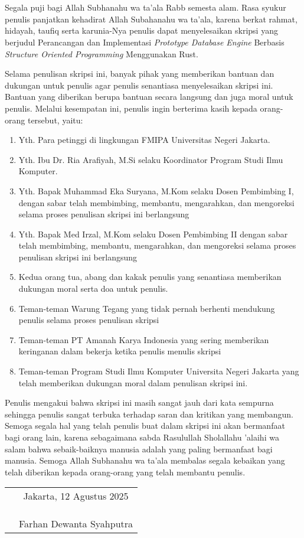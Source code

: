 \chapter*{}
\onehalfspacing{}
Segala puji bagi Allah Subhanahu wa ta'ala Rabb semesta alam. Rasa syukur penulis 
panjatkan kehadirat Allah Subahanahu wa ta'ala, karena berkat rahmat, hidayah, 
taufiq serta karunia-Nya penulis dapat menyelesaikan skripsi
yang berjudul Perancangan dan Implementasi \emph{Prototype Database Engine} Berbasis 
\emph{Structure Oriented Programming} Menggunakan Rust. 

Selama penulisan skripsi ini, banyak pihak yang memberikan bantuan dan dukungan 
untuk penulis agar penulis senantiasa menyelesaikan skripsi ini. Bantuan yang diberikan
berupa bantuan secara langsung dan juga moral untuk penulis. Melalui kesempatan ini, 
penulis ingin berterima kasih kepada orang-orang tersebut, yaitu:

\begin{enumerate}
	\item{Yth. Para petinggi di lingkungan FMIPA Universitas Negeri Jakarta.}
	\item{Yth. Ibu Dr. Ria Arafiyah, M.Si selaku Koordinator Program Studi Ilmu
		Komputer.}
	\item{Yth. Bapak Muhammad Eka Suryana, M.Kom selaku Dosen Pembimbing I, dengan 
	sabar telah membimbing, membantu, mengarahkan, dan mengoreksi selama proses 
	penulisan skripsi ini berlangsung}
	\item{Yth. Bapak Med Irzal, M.Kom selaku Dosen Pembimbing II dengan 
	sabar telah membimbing, membantu, mengarahkan, dan mengoreksi selama proses 
	penulisan skripsi ini berlangsung}
	\item{Kedua orang tua, abang dan kakak penulis yang senantiasa memberikan 
		dukungan moral serta doa untuk penulis.}
	\item{Teman-teman Warung Tegang yang tidak pernah berhenti mendukung penulis selama proses penulisan skripsi}
	\item{Teman-teman PT Amanah Karya Indonesia yang sering memberikan keringanan dalam bekerja ketika penulis menulis skripsi}
	\item{Teman-teman Program Studi Ilmu Komputer Universita Negeri Jakarta yang telah memberikan 
		dukungan moral dalam penulisan skripsi ini.}
\end{enumerate}

Penulis mengakui bahwa skripsi ini masih sangat jauh dari kata sempurna sehingga penulis 
sangat terbuka terhadap saran dan kritikan yang membangun. Semoga segala hal yang telah 
penulis buat dalam skripsi ini akan bermanfaat bagi orang lain, karena sebagaimana sabda 
Rasulullah Sholallahu 'alaihi wa salam bahwa sebaik-baiknya manusia adalah yang paling 
bermanfaat bagi manusia. Semoga Allah Subhanahu wa ta'ala membalas segala kebaikan yang telah diberikan 
kepada orang-orang yang telah membantu penulis.

\vspace{4cm}

\begin{tabular}{p{7.5cm}c}
	&Jakarta, 12 Agustus 2025\\
	&\\
	&\\
	&\\
	&Farhan Dewanta Syahputra
\end{tabular}
